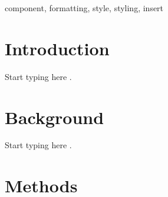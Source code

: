 \documentclass[conference]{IEEEtran}
\begin{document}
\begin{abstract}
This document is a model and instructions for \LaTeX.
This and the IEEEtran.cls file define the components of your paper [title, text, heads, etc.]. *CRITICAL: Do Not Use Symbols, Special Characters, Footnotes, 
or Math in Paper Title or Abstract.
This document is a model and instructions for \LaTeX.
This and the IEEEtran.cls file define the components of your paper [title, text, heads, etc.]. *CRITICAL: Do Not Use Symbols, Special Characters, Footnotes, 
or Math in Paper Title or Abstract.
This document is a model and instructions for \LaTeX.
This and the IEEEtran.cls file define the components of your paper [title, text, heads, etc.]. *CRITICAL: Do Not Use Symbols, Special Characters, Footnotes, 
or Math in Paper Title or Abstract.
This document is a model and instructions for \LaTeX.
This and the IEEEtran.cls file define the components of your paper [title, text, heads, etc.]. *CRITICAL: Do Not Use Symbols, Special Characters, Footnotes, 
or Math in Paper Title or Abstract.

\end{abstract}



\begin{IEEEkeywords}
component, formatting, style, styling, insert
\end{IEEEkeywords}

\section{Introduction}

Start typing here \cite{b1}.

\section{Background}

Start typing here \cite{b2}.

\section{Methods}
\end{document}
